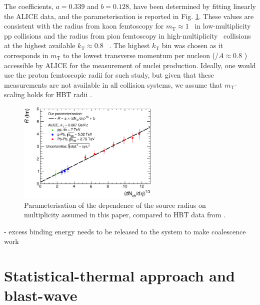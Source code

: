 \documentclass[a4paper,11pt]{scrartcl} %
\begin{document}
The coefficients, $a = 0.339$ and $b = 0.128$, have been determined by fitting linearly the ALICE data, and the parameterisation is reported in Fig. \ref{fig:radiiparam}. 
These values are consistent with the radius from kaon femtoscopy for $m_{\mathrm{T}} \approx 1$ \GeVc~in low-multiplicity pp collisions \cite{Abelev:2012sq} and the radius from pion femtoscopy in high-multiplicity \PbPb~collisions at the highest available $k_{\mathrm{T}} \approx 0.8$ \GeVc~\cite{Adam:2015vna}. 
The highest $k_{\mathrm{T}}$ bin was chosen as it corresponds in $m_{\mathrm{T}}$ to the lowest transverse momentum per nucleon (\pt/$A \approx 0.8$ \GeVc) accessible by ALICE for the measurement of nuclei production. 
Ideally, one would use the proton femtoscopic radii for such study, but given that these measurements are not  available in all collision systems, we assume that $m_{\mathrm{T}}$-scaling holds for HBT radii \cite{Adam:2015vja}.

\begin{figure}[htbp]
\begin{center}
\includegraphics[width=0.6\textwidth]{HbtRadiusParam.eps}
\caption{Parameterisation of the dependence of the source radius on multiplicity assumed in this paper, compared to HBT data from \cite{Adam:2015vna, Abelev:2012sq}.}
\label{fig:radiiparam}
\end{center}
\end{figure}


- excess binding energy needs to be released to the system to make coalescence work


\section{Statistical-thermal approach and blast-wave}\label{sec:thermal}
\end{document}

